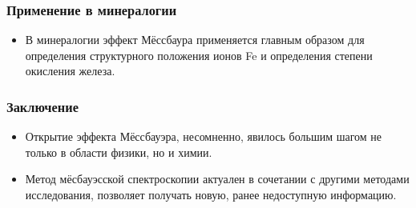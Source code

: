 \documentclass[t]{beamer}
\begin{document}
\begin{frame}
  \frametitle{Применение в минералогии} 
  \begin{itemize}
    \item В минералогии эффект Мёссбаура применяется главным образом для
      определения структурного положения ионов Fe и определения степени
      окисления железа.
  \end{itemize}
\end{frame}

\begin{frame}
  \frametitle{Заключение}
  \begin{itemize}
    \item Открытие эффекта Мёссбауэра, несомненно, явилось большим шагом не
      только в области физики, но и химии. \pause
    \item Метод мёсбауэсской спектроскопии актуален в сочетании с другими
      методами исследования, позволяет получать новую, ранее недоступную
      информацию.
  \end{itemize}
\end{frame}

\ITMOthankspage
\end{document}
